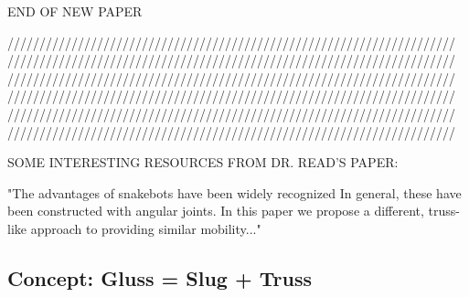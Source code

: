 \documentclass[11pt]{article}
\begin{document}
END OF NEW PAPER

//////////////////////////////////////////////////////////////////////
//////////////////////////////////////////////////////////////////////
//////////////////////////////////////////////////////////////////////
//////////////////////////////////////////////////////////////////////
//////////////////////////////////////////////////////////////////////
//////////////////////////////////////////////////////////////////////



SOME INTERESTING RESOURCES FROM DR. READ'S PAPER:





"The advantages of snakebots have been widely recognized %
In general, these have been constructed
with angular joints. In this paper we propose a different, truss-like approach to providing similar
mobility..."


\subsection{Concept: Gluss = Slug + Truss}
\end{document}
